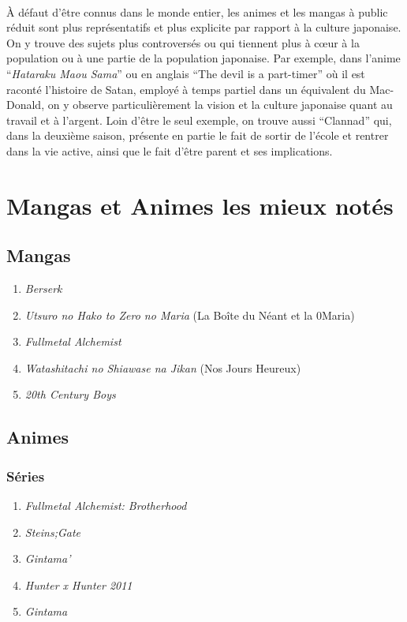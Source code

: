 \paragraph{} À défaut d'être connus dans le monde entier, les animes  et les
mangas à public réduit sont plus représentatifs et plus explicite par rapport à
la culture japonaise. On y trouve des sujets plus controversés ou qui tiennent
plus à cœur à la population ou à une partie de la population japonaise. Par
exemple, dans l'anime ``\textit{Hataraku Maou Sama}'' ou en anglais ``The devil
is a part-timer'' où il est raconté l'histoire de Satan, employé à temps
partiel dans un équivalent du Mac-Donald, on y observe particulièrement la
vision et la culture japonaise quant au travail et à l'argent. Loin d'être le
seul exemple, on trouve aussi ``Clannad'' qui, dans la deuxième saison,
présente en partie le fait de sortir de l'école et rentrer dans la vie active,
ainsi que le fait d'être parent et ses implications.

\section[Toplist]{Mangas et Animes les mieux notés}

\subsection{Mangas}

\begin{enumerate}
	\item \emph{Berserk}
	\item \emph{Utsuro no Hako to Zero no Maria} (La Boîte du Néant et la 0\ieme Maria)
	\item \emph{Fullmetal Alchemist}
	\item \emph{Watashitachi no Shiawase na Jikan} (Nos Jours Heureux)
	\item \emph{20th Century Boys}
\end{enumerate}

\subsection{Animes}

\subsubsection{Séries}

\begin{enumerate}
	\item \emph{Fullmetal Alchemist: Brotherhood}
	\item \emph{Steins;Gate}
	\item \emph{Gintama'}
	\item \emph{Hunter x Hunter 2011}
	\item \emph{Gintama\degres}
\end{enumerate}

